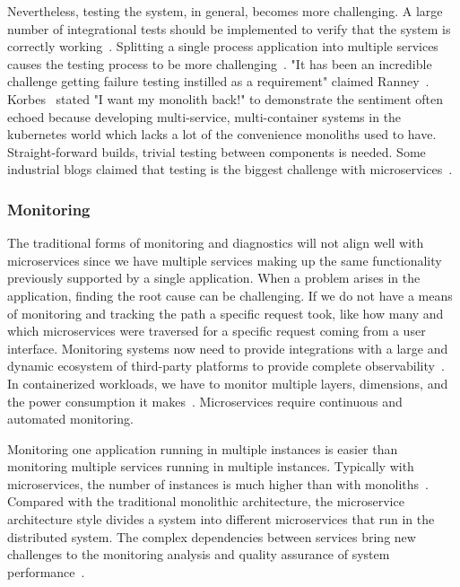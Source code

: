 \par Nevertheless, testing the system, in general, becomes more challenging. A large number of integrational tests should be implemented to verify that the system is correctly working~\cite{Zaytev2018}. Splitting a single process application into multiple services causes the testing process to be more challenging~\cite{Huttunen2017}. 
"It has been an incredible challenge getting failure testing instilled as a requirement" claimed Ranney~\cite{Matt2016}. 
%
Korbes~\cite{Ellen2018} stated "I want my monolith back!" to demonstrate the sentiment often echoed because developing multi-service, multi-container systems in the kubernetes world which lacks a lot of the convenience monoliths used to have.
Straight-forward builds, trivial testing between components is needed. Some industrial blogs claimed that testing is the biggest challenge with microservices~\cite{Karma, Soundcloud}.



\subsubsection{Monitoring}%


The traditional forms of monitoring and diagnostics will not align well with microservices since we have multiple services making up the same functionality previously supported by a single application. 
When a problem arises in the application, finding the root cause can be challenging. If we do not have a means of monitoring and tracking the path a specific request took, like how many and which microservices were traversed for a specific request coming from a user interface. Monitoring systems now need to provide integrations with a large and dynamic ecosystem of third-party platforms to provide complete observability~\cite{Netflix}. In containerized workloads, we have to monitor multiple layers, dimensions, and the power consumption it makes~\cite{Kristiani2020}. Microservices require continuous and automated monitoring. 

\par Monitoring one application running in multiple instances is easier than monitoring multiple services running in multiple instances. Typically with microservices, the number of instances is much higher than with monoliths~\cite{Kalske2017paper}. Compared with the traditional monolithic architecture, the microservice architecture style divides a system into different microservices that run in the distributed system. The complex dependencies between services bring new challenges to the monitoring analysis and quality assurance of system performance~\cite{Zhihui2020, Venugopal2017}. 

